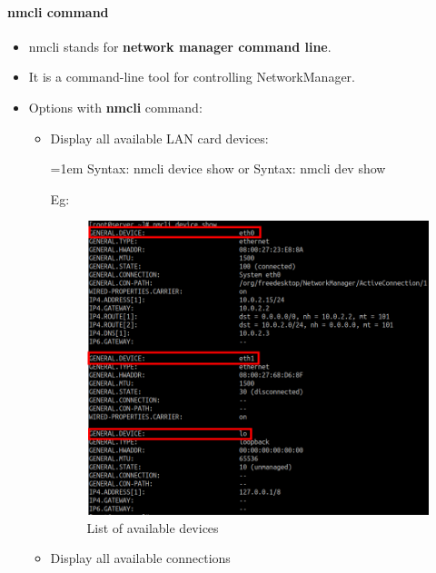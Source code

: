 \setlength{\columnsep}{3pt}
\begin{flushleft}
\bigskip

\paragraph{nmcli command}

\begin{itemize}
	\item nmcli stands for \textbf{network manager command line}.
	\item It is a command-line tool for controlling NetworkManager.
	\item Options with \textbf{nmcli} command:
	\begin{itemize}
		\item Display all available LAN card devices:
		\begin{tcolorbox}[breakable,notitle,boxrule=-0pt,colback=pink,colframe=pink]
			\color{black}
			\font=1em
			Syntax: nmcli device show
			\newline
			or
			\newline
			Syntax: nmcli dev show
			\font=4pt
		\end{tcolorbox}
		Eg:
		\begin{figure}[h!]
			\centering
			\includegraphics[scale=.35]{content/chapter14/images/cards.png}
			\caption{List of available devices}
			\label{fig:devices}
		\end{figure}		
		\newpage
		\item Display all available connections

\end{itemize}
\end{itemize}
\end{flushleft}
